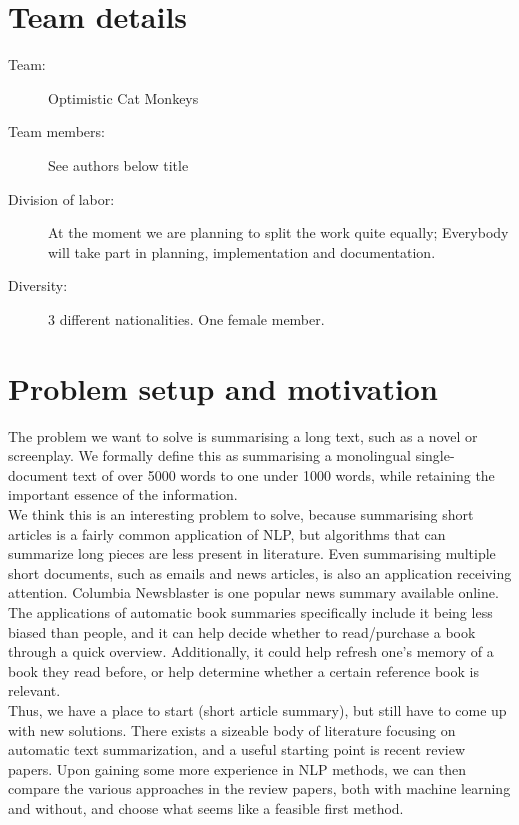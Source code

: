\section{Team details}
\begin{description}
  \item[Team:] Optimistic Cat Monkeys
  \item[Team members:] See authors below title
  \item[Division of labor:] At the moment we are planning to split the work
    quite equally; Everybody will take part in planning, implementation and
    documentation.
  \item[Diversity:] 3 different nationalities. One female member.
\end{description}


\section{Problem setup and motivation}

The problem we want to solve is summarising a long text, such as a novel or screenplay. We formally define this as summarising a monolingual single-document text of over 5000 words to one under 1000 words, while retaining the important essence of the information.\\
We think this is an interesting problem to solve, because summarising short articles is a fairly common application of NLP, but algorithms that can summarize long pieces are less present in literature. Even summarising multiple short documents, such as emails and news articles, is also an application receiving attention. Columbia Newsblaster is one popular news summary available online. \\
The applications of automatic book summaries specifically include it being less biased than people, and it can help decide whether to read/purchase a book through a quick overview. Additionally, it could help refresh one's memory of a book they read before, or help determine whether a certain reference book is relevant.\\
Thus, we have a place to start (short article summary), but still have to come up with new solutions. There exists a sizeable body of literature focusing on automatic text summarization, and a useful starting point is recent review papers. Upon gaining some more experience in NLP methods, we can then compare the various approaches in the review papers, both with machine learning and without, and choose what seems like a feasible first method. \cite{Kumar2016}


